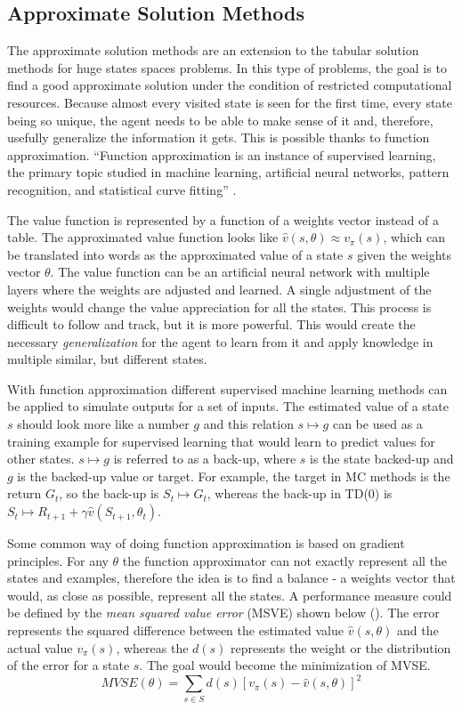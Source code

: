 \subsection{Approximate Solution Methods}\label{Approximate solution methods}
The approximate solution methods are an extension to the tabular solution methods for huge states spaces problems. In this type of problems, the goal is to find a good approximate solution under the condition of restricted computational resources. Because almost every visited state is seen for the first time, every state being so unique, the agent needs to be able to make sense of it and, therefore, usefully generalize the information it gets. This is possible thanks to function approximation. “Function approximation is an instance of supervised learning, the primary topic studied in machine learning, artificial neural networks, pattern recognition, and statistical curve fitting” \cite{Sutton}.

The value function is represented by a function of a weights vector instead of a table. The approximated value function looks like $\hat{v}(s,\theta)\approx v_{\pi}(s)$, which can be translated into words as the approximated value of a state $s$ given the weights vector $\theta$. The value function can be an artificial neural network with multiple layers where the weights are adjusted and learned. A single adjustment of the weights would change the value appreciation for all the states. This process is difficult to follow and track, but it is more powerful. This would create the necessary \textit{generalization} for the agent to learn from it and apply knowledge in multiple similar, but different states.

With function approximation different supervised machine learning methods can be applied to simulate outputs for a set of inputs. The estimated value of a state $s$ should look more like a number $g$ and this relation $s \mapsto g$ can be used as a training example for supervised learning that would learn to predict values for other states. $s \mapsto g$ is referred to as a back-up, where $s$ is the state backed-up and $g$ is the backed-up value or target. For example, the target in MC methods is the return $G_{t}$, so the back-up is $S_{t} \mapsto G_{t}$, whereas the back-up in TD(0) is $S_{t} \mapsto R_{t+1}+\gamma\hat{v}(S_{t+1}, \theta_{t}) $.

Some common way of doing function approximation is based on gradient principles. For any $\theta$ the function approximator can not exactly represent all the states and examples, therefore the idea is to find a balance - a weights vector that would, as close as possible, represent all the states. A performance measure could be defined by the \textit{mean squared value error} (MSVE) shown below (). The error represents the squared difference between the estimated value $\hat{v}(s,\theta)$ and the actual value $v_{\pi}(s)$, whereas the $d(s)$ represents the weight or the distribution of the error for a state $s$. The goal would become the minimization of MVSE.
\begin{equation}\label{MSVE}
MVSE(\theta)=\sum_{s\in S} d(s) \left [ v_{\pi}(s) - \hat{v}(s,\theta) \right ]^{2}
\end{equation}

